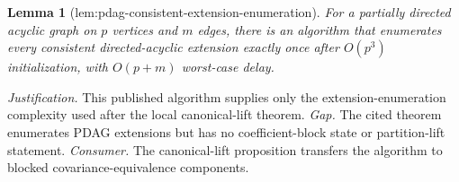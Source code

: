 \documentclass{article}
\newtheorem{lemma}{Lemma}
\begin{document}
\begin{lemma}[lem:pdag-consistent-extension-enumeration]\label{lem:pdag-consistent-extension-enumeration}
For a partially directed acyclic graph on \(p\) vertices and \(m\) edges, there is an algorithm that enumerates every consistent directed-acyclic extension exactly once after \(O(p^3)\) initialization, with \(O(p+m)\) worst-case delay.
\end{lemma}
\par\smallskip\noindent \textit{Justification.} This published algorithm supplies only the extension-enumeration complexity used after the local canonical-lift theorem. \textit{Gap.} The cited theorem enumerates PDAG extensions but has no coefficient-block state or partition-lift statement. \textit{Consumer.} The canonical-lift proposition transfers the algorithm to blocked covariance-equivalence components.
\end{document}
